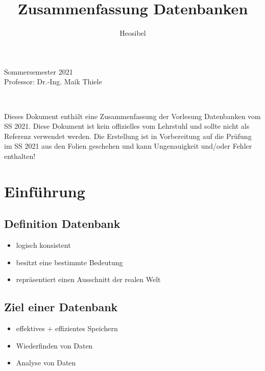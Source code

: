 \documentclass[a4paper]{article}
\title{Zusammenfassung Datenbanken}
\author{Heosibel}
\begin{document}
\maketitle


\begin{center}
    Sommersemester 2021 \\
    Professor: Dr.-Ing. Maik Thiele
\end{center}

\,

\begin{center}
    Dieses Dokument enthält eine Zusammenfassung der Vorlesung Datenbanken vom SS 2021.
    Diese Dokument ist kein offizielles vom Lehrstuhl und sollte nicht als Referenz verwendet werden.
    Die Erstellung ist in Vorbereitung auf die Prüfung im SS 2021 aus den Folien geschehen und kann Ungenauigkeit und/oder Fehler enthalten!
\end{center}


\newpage

\tableofcontents

\newpage

\section{Einführung}

\subsection{Definition Datenbank}
\begin{itemize}
    \item logisch konsistent  
    \item besitzt eine bestimmte Bedeutung
    \item repräsentiert einen Ausschnitt der realen Welt
\end{itemize}

\subsection{Ziel einer Datenbank}
\begin{itemize}
    \item effektives + effizientes Speichern
    \item Wiederfinden von Daten
    \item Analyse von Daten
\end{itemize}
\end{document}
